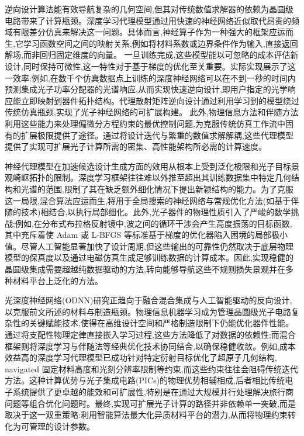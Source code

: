 \documentclass[11pt]{article}
\begin{document}
逆向设计算法能有效导航复杂的几何空间,但其对传统数值求解器的依赖为晶圆级电路带来了计算瓶颈。深度学习代理模型通过用快速的神经网络近似取代昂贵的频域有限差分仿真来解决这一问题。具体而言,神经算子作为一种强大的框架应运而生,它学习函数空间之间的映射关系,例如将材料系数或边界条件作为输入,直接返回解场,而非回归固定维度的向量。\citep{doi_10_48550_arxiv_2303_10506_0452bde4} 一旦训练完成,这些模型能以可忽略的成本评估新设计,同时保持可微性,这一特性对于基于梯度的优化至关重要。实际实现展示了这一效率;例如,在数千个仿真数据点上训练的深度神经网络可以在不到一秒的时间内预测集成光子功率分配器的光谱响应,从而实现快速逆向设计,即用户指定的光学响应能立即映射到器件拓扑结构。代理散射矩阵逆向设计通过利用学习到的模型绕过传统仿真瓶颈,实现了光子神经网络的可扩展构建。\citep{s2_753a5d83a96e0194da93bcb6f20fa0bd356e37fa_c11e3796} 此外,物理信息方法和伴随方法利用这些能力来处理偏微分方程约束的最优控制问题,为克服传统仿真工作流中固有的扩展极限提供了途径。通过将设计迭代与繁重的数值求解解耦,这些代理模型提供了实现可扩展光子计算所需的密集、高性能架构所必需的计算速度。\citep{doi_10_48550_arxiv_2601_00199_c689b34d} \citep{doi_10_1038_s41598_018_37952_2_076b64f9} \citep{doi_10_48550_arxiv_2606_12337_68b62bfa}

神经代理模型在加速候选设计生成方面的效用从根本上受到泛化极限和光子目标景观崎岖拓扑的限制。深度学习框架往往难以外推至超出其训练数据集中特定几何结构和光谱的范围,限制了其在缺乏额外细化情况下提出新颖结构的能力。为了克服这一局限,混合算法应运而生,将用于全局搜索的神经网络与常规优化方法(如基于伴随的技术)相结合,以执行局部细化。此外,光子器件的物理性质引入了严峻的数学挑战;例如,在分布式布拉格反射镜中,波之间的循环干涉会产生高度振荡的目标函数,其中充斥着使 Adam 或 L-BFGS 等标准基于梯度的优化器陷入困境的局部极小值。尽管人工智能显著加快了设计周期,但这些输出的可靠性仍然取决于底层物理模型的保真度以及通过电磁仿真生成足够训练数据的计算成本。因此,实现稳健的晶圆级集成需要超越纯数据驱动的方法,转向能够导航这些不规则损失景观并在多种材料平台上泛化的方法。\citep{doi_10_1021_acsphotonics_2c00968_06a2e96b} \citep{doi_10_48550_arxiv_2602_18148_e9c0a72b} \citep{doi_10_1515_nanoph_2024_0536_4b6631ba}

光深度神经网络(ODNN)研究正趋向于融合混合集成与人工智能驱动的反向设计,以克服前文所述的材料与制造瓶颈。物理信息机器学习成为管理晶圆级光子电路复杂性的关键赋能技术,使得在高维设计空间和严格制造限制下仍能优化器件性能。通过将支配性物理定律直接嵌入学习过程,这些方法降低了对数据的依赖性;而混合框架则将深度学习与伴随法等经典优化技术协同结合,以确保稳健收敛。例如,成本效益高的深度学习代理模型已成功针对特定衍射目标优化了超原子几何结构, navigated 固定材料高度和光刻分辨率限制等约束,而这些约束往往会阻碍传统迭代方法。这种计算优势与光子集成电路(PICs)的物理优势相辅相成,后者相比传统电子系统提供了更卓越的能效和可扩展性,特别是在通过大规模并行处理解决旅行商问题等组合优化问题时。最终,实现可扩展光子计算的路径并非依赖单一突破,而是取决于这一双重策略:利用智能算法最大化异质材料平台的潜力,从而将物理约束转化为可管理的设计参数。\citep{doi_10_1109_sbfotoniopc62248_2024_10813471_692f0088} \citep{doi_10_1021_acsami_5c03196_32a62b73} \citep{doi_10_3390_nano14080697_c372a140}
\end{document}

